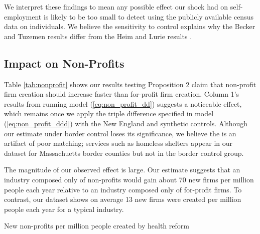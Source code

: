 \documentclass[12pt]{article}
\begin{document}
We interpret these findings to mean any possible effect our shock had on self-employment is likely to be too small to detect using the publicly available census data on individuals. We believe the sensitivity to control explains why the Becker and Tuzemen \citep{tuzemen2014self} results differ from the Heim and Lurie results \citep{heim2014does}. 

\subsection{Impact on Non-Profits}

Table \ref{tab:nonprofit} shows our results testing Proposition 2 claim that non-profit firm creation should increase faster than for-profit firm creation. Column 1's results from running model (\ref{eq:non_profit_dd}) suggests a noticeable effect, which remains once we apply the triple difference specified in model (\ref{eq:non_profit_ddd}) with the New England and synthetic controls. Although our estimate under border control loses its significance, we believe the is an artifact of poor matching; services such as homeless shelters appear in our dataset for Massachuetts border counties but not in the border control group. 

The magnitude of our observed effect is large. Our estimate suggests that an industry composed only of non-profits would gain about 70 new firms per million people each year relative to an industry composed only of for-profit firms. To contrast, our dataset shows on average 13 new firms were created per million people each year for a typical industry. 

\begin{table}[H]
	\footnotesize
	\centering
	\caption{New non-profits per million people created by health reform}
	
	\label{tab:nonprofit}
\end{table}
\end{document}
